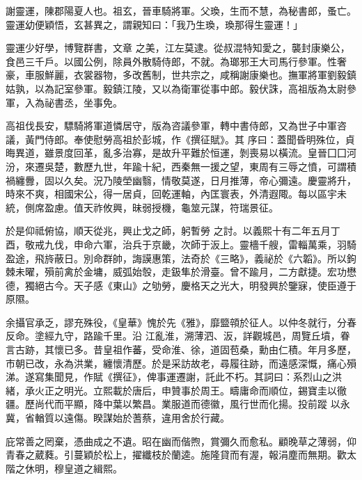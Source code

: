 
\begin{pinyinscope}

 謝靈運，陳郡陽夏人也。祖玄，晉車騎將軍。父瑍，生而不慧，為秘書郎，蚤亡。靈運幼便穎悟，玄甚異之，謂親知曰：「我乃生瑍，瑍那得生靈運！」



 靈運少好學，博覽群書，文章
 之美，江左莫逮。從叔混特知愛之，襲封康樂公，食邑三千戶。以國公例，除員外散騎侍郎，不就。為瑯邪王大司馬行參軍。性奢豪，車服鮮麗，衣裳器物，多改舊制，世共宗之，咸稱謝康樂也。撫軍將軍劉毅鎮姑孰，以為記室參軍。毅鎮江陵，又以為衛軍從事中郎。毅伏誅，高祖版為太尉參軍，入為祕書丞，坐事免。



 高祖伐長安，驃騎將軍道憐居守，版為咨議參軍，轉中書侍郎，又為世子中軍咨議，黃門侍郎。奉使慰勞高祖於彭城，作《撰征賦》。其
 序曰：蓋聞昏明殊位，貞晦異道，雖景度回革，亂多治寡，是故升平難於恒運，剝喪易以橫流。皇晉囗囗河汾，來遷吳楚，數歷九世，年踰十紀，西秦無一援之望，東周有三辱之憤，可謂積禍纏釁，固以久矣。況乃陵塋幽翳，情敬莫遂，日月推薄，帝心彌遠。慶靈將升，時來不爽，相國宋公，得一居貞，回乾運軸，內匡寰表，外清遐陬。每以區宇未統，側席盈慮。值天祚攸興，昧弱授機，龜筮元謀，符瑞景征。



 於是仰祗俯協，順天從兆，興止戈之師，躬暫勞
 之討。以義熙十有二年五月丁酉，敬戒九伐，申命六軍，治兵于京畿，次師于汳上。靈檣千艘，雷輜萬乘，羽騎盈途，飛旍蔽日。別命群帥，誨謨惠策，法奇於《三略》，義祕於《六韜》。所以鉤棘未曜，殞前禽於金墉，威弧始彀，走鈒隼於滑臺。曾不踰月，二方獻捷。宏功懋德，獨絕古今。天子感《東山》之劬勞，慶格天之光大，明發興於鑒寐，使臣遵于原隰。



 余攝官承乏，謬充殊役，《皇華》愧於先《雅》，靡盬顇於征人。以仲冬就行，分春反命。塗經九守，路踰千里。沿
 江亂淮，溯薄泗、汳，詳觀城邑，周覽丘墳，眷言古跡，其懷已多。昔皇祖作蕃，受命淮、徐，道固苞桑，勳由仁積。年月多歷，市朝已改，永為洪業，纏懷清歷。於是采訪故老，尋履往跡，而遠感深慨，痛心殞涕。遂寫集聞見，作賦《撰征》，俾事運遷謝，託此不朽。其詞曰：系烈山之洪緒，承火正之明光。立熙載於唐后，申贊事於周王。疇庸命而順位，錫寶圭以徹疆。歷尚代而平顯，降中葉以繁昌。業服道而德徽，風行世而化揚。投前蹤
 以永冀，省輶質以遠傷。睽謀始於蓍蔡，違用舍於行藏。



 庇常善之罔棄，憑曲成之不遺。昭在幽而偕煦，賞彌久而愈私。顧晚草之薄弱，仰青春之葳蕤。引蔓穎於松上，擢纖枝於蘭逵。施隆貸而有渥，報涓塵而無期。歡太階之休明，穆皇道之緝熙。




\end{pinyinscope}
